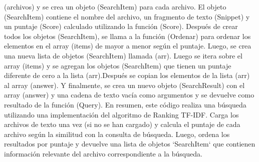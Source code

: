 \documentclass{beamer}
\begin{document}
\begin{frame}
(archivos) y se crea un objeto (SearchItem) para cada archivo. El objeto (SearchItem) contiene el nombre del archivo, un fragmento de texto (Snippet) y un puntaje (Score) calculado utilizando la función (Score). Después de crear todos los objetos (SearchItem), se llama a la función (Ordenar) para ordenar los elementos en el array (items) de mayor a menor según el puntaje. Luego, se crea una nueva lista de objetos (SearchItem) llamada (arr). Luego  se itera sobre el array (items) y se agregan los objetos (SearchItem) que tienen un puntaje diferente de cero a la lista (arr).Después se copian los elementos de la lista (arr) al array (answer). Y finalmente, se crea un nuevo objeto (SearchResult) con el array (answer) y una cadena de texto vacía como argumentos y se devuelve como resultado de la función (Query). En resumen, este código realiza una búsqueda utilizando una implementación del algoritmo de Ranking TF-IDF. Carga los archivos de texto una vez (si no se han cargado) y calcula el puntaje de cada archivo según la similitud con la consulta de búsqueda. Luego, ordena los resultados por puntaje y devuelve una lista de objetos `SearchItem` que contienen información relevante del archivo correspondiente a la búsqueda.

\end{frame}
\end{document}
